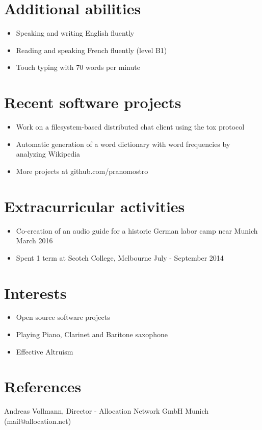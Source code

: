 \documentclass[11pt,a4paper]{article}
\begin{document}
\section*{Additional abilities}
\begin{itemize}
	\setlength{\itemsep}{1pt}
	\item Speaking and writing English fluently
	\item Reading and speaking French fluently (level B1)
	\item Touch typing with 70 words per minute
\end{itemize}

\section*{Recent software projects}
\begin{itemize}
	\setlength{\itemsep}{1pt}
	\item Work on a filesystem-based distributed chat client using the tox protocol
	\item Automatic generation of a word dictionary with word
	frequencies by analyzing Wikipedia
	\item More projects at github.com/pranomostro
\end{itemize}

\section*{Extracurricular activities}
\begin{itemize}
	\setlength{\itemsep}{1pt}
	\item[] Co-creation of an audio guide for a historic German labor camp near Munich
	\hfill March 2016
	\item[] Spent 1 term at Scotch College, Melbourne \hfill July - September 2014
\end{itemize}

\section*{Interests}
\begin{itemize}
	\setlength{\itemsep}{1pt}
	\item Open source software projects
	\item Playing Piano, Clarinet and Baritone saxophone
	\item Effective Altruism
\end{itemize}

\section*{References}
Andreas Vollmann, Director - Allocation Network GmbH Munich (mail@allocation.net)
\end{document}
